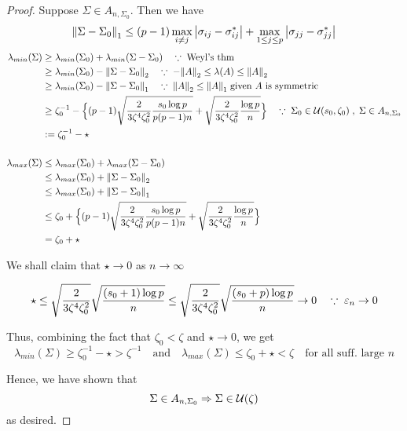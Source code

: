 \begin{proof}
    Suppose $\Sigma \in A_{n, \Sigma_0}$. Then we have \[\norm{\Sigma- \Sigma_0}_1 \leq (p-1)\max_{i\neq j}\abs{\sigma_{ij}- \sigma_{ij}^*} + \max_{1\leq j\leq p}\abs{\sigma_{jj} - \sigma_{jj}^*}\]
    \begin{align*}
        \lambda_{min}(\Sigma) &\geq \lambda_{min}(\Sigma_0) + \lambda_{min}(\Sigma-\Sigma_0) \quad \because \; \text{Weyl's thm} \\ 
        &\geq \lambda_{min}(\Sigma_0) - \norm{\Sigma- \Sigma_0}_2 \quad \because \; -\norm{A}_2 \leq \lambda(A) \leq \norm{A}_2 \\
        &\geq \lambda_{min}(\Sigma_0) - \norm{\Sigma-\Sigma_0}_1 \quad \because \; \norm{A}_2 \leq \norm{A}_1 \; \text{given } A \text{ is symmetric } \\
        &\geq \zeta_0^{-1} - \Big\{ (p-1)\sqrt{ \frac{2}{3\zeta^4\zeta_0^2}\frac{s_0\log p}{p(p-1)n}}  + \sqrt{\frac{2}{3\zeta^4 \zeta_0^2}\frac{\log p}{n} } \Big\} \quad \because \; \Sigma_0 \in \mathcal{U}(s_0, \zeta_0)\;,\; \Sigma \in A_{n, \Sigma_0} \\
        &:= \zeta_0^{-1} - \star \\
        & \\
        \lambda_{max}(\Sigma) &\leq \lambda_{max}(\Sigma_0) + \lambda_{max}(\Sigma- \Sigma_0) \\
        &\leq \lambda_{max}(\Sigma_0) + \norm{\Sigma - \Sigma_0}_2 \\
        &\leq \lambda_{max}(\Sigma_0) + \norm{\Sigma - \Sigma_0}_1 \\
        &\leq \zeta_0 + \Big\{ (p-1)\sqrt{ \frac{2}{3\zeta^4\zeta_0^2}\frac{s_0\log p}{p(p-1)n}}  + \sqrt{\frac{2}{3\zeta^4 \zeta_0^2}\frac{\log p}{n} } \Big\} \\
        &= \zeta_0 + \star 
    \end{align*}
  

    We shall claim that $\star \rightarrow 0$ as $n\rightarrow \infty$

    \[\star \leq \sqrt{\frac{2}{3\zeta^4\zeta_0^2}} \sqrt{\frac{(s_0+1)\log p}{n}} \leq \sqrt{\frac{2}{3\zeta^4\zeta_0^2}} \sqrt{\frac{(s_0+p)\log p}{n}} \rightarrow 0 \quad \because \; \varepsilon_n \rightarrow 0 \]

    Thus, combining the fact that $\zeta_0 < \zeta$ and $\star \rightarrow 0$, we get \[\lambda_{min}(\Sigma)\geq \zeta_0^{-1} - \star > \zeta^{-1} \quad \text{and} \quad \lambda_{max}(\Sigma)\leq \zeta_0 + \star < \zeta \quad \text{for all suff. large } n\]

    Hence, we have shown that \[\Sigma \in A_{n, \Sigma_0} \Rightarrow \Sigma \in \mathcal{U}(\zeta)\] as desired.


\end{proof}
